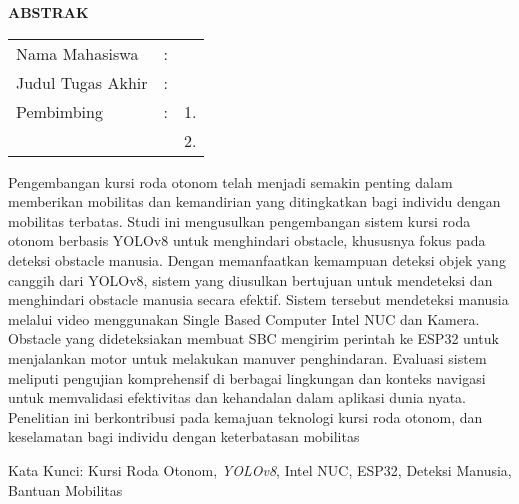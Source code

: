 \begin{center}
  \large\textbf{ABSTRAK}
\end{center}


\vspace{2ex}

\begingroup
\setlength{\tabcolsep}{0pt}

\noindent
\begin{tabularx}{\textwidth}{l >{\centering}m{2em} X}
  Nama Mahasiswa    & : & \name{}         \\

  Judul Tugas Akhir & : & \tatitle{}      \\

  Pembimbing        & : & 1. \advisor{}   \\
                    &   & 2. \coadvisor{} \\
\end{tabularx}
\endgroup

Pengembangan kursi roda otonom telah menjadi semakin penting dalam memberikan mobilitas dan kemandirian yang ditingkatkan bagi individu dengan mobilitas terbatas. Studi ini mengusulkan pengembangan sistem kursi roda otonom berbasis YOLOv8 untuk menghindari obstacle, khususnya fokus pada deteksi obstacle manusia. Dengan memanfaatkan kemampuan deteksi objek yang canggih dari YOLOv8, sistem yang diusulkan bertujuan untuk mendeteksi dan menghindari obstacle manusia secara efektif. Sistem tersebut mendeteksi manusia melalui video menggunakan Single Based Computer Intel NUC dan Kamera. Obstacle yang dideteksiakan membuat SBC mengirim perintah ke ESP32 untuk menjalankan motor untuk melakukan manuver penghindaran. Evaluasi sistem meliputi pengujian komprehensif di berbagai lingkungan dan konteks navigasi untuk memvalidasi efektivitas dan kehandalan dalam aplikasi dunia nyata. Penelitian ini berkontribusi pada kemajuan teknologi kursi roda otonom, dan keselamatan bagi individu dengan keterbatasan mobilitas

Kata Kunci: Kursi Roda Otonom, \emph{YOLOv8}, Intel NUC, ESP32, Deteksi Manusia, Bantuan Mobilitas
